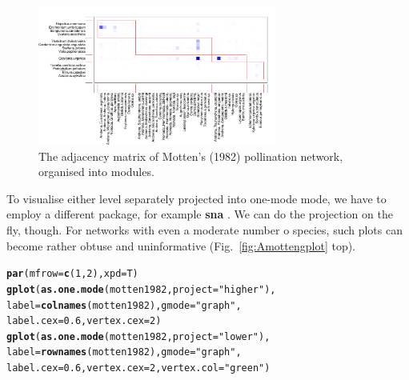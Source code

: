 \documentclass[a4paper, 11pt]{article}\usepackage[]{graphicx}\usepackage[]{color}
\makeatletter
\newcommand{\hlnum}[1]{\textcolor[rgb]{0.686,0.059,0.569}{#1}}%
\newcommand{\hlstr}[1]{\textcolor[rgb]{0.192,0.494,0.8}{#1}}%
\newcommand{\hlstd}[1]{\textcolor[rgb]{0.345,0.345,0.345}{#1}}%
\newcommand{\hlkwc}[1]{\textcolor[rgb]{0.333,0.667,0.333}{#1}}%
\newcommand{\hlkwd}[1]{\textcolor[rgb]{0.737,0.353,0.396}{\textbf{#1}}}%
\newenvironment{kframe}{%
 \def\at@end@of@kframe{}%
 \ifinner\ifhmode%
  \def\at@end@of@kframe{\end{minipage}}%
  \begin{minipage}{\columnwidth}%
 \fi\fi%
 \def\FrameCommand##1{\hskip\@totalleftmargin \hskip-\fboxsep
 \colorbox{shadecolor}{##1}\hskip-\fboxsep
     \hskip-\linewidth \hskip-\@totalleftmargin \hskip\columnwidth}%
 \MakeFramed {\advance\hsize-\width
   \@totalleftmargin\z@ \linewidth\hsize
   \@setminipage}}%
 {\par\unskip\endMakeFramed%
 \at@end@of@kframe}
\newenvironment{knitrout}{}{} %
\newcommand{\package}[1]{\textbf{#1}}
\makeatother
\begin{document}
\begin{figure}%
\centering
	\includegraphics[width=0.7\textwidth]{figures/motten1982_moduleplot}
	\caption{The adjacency matrix of Motten's (1982) pollination network, organised into modules.}
	\label{fig:Amoduleplot}
\end{figure}
%
To visualise either level separately projected into one-mode mode, we have to employ a different package, for example \package{sna} \citep{Butts2013}. We can do the projection on the fly, though. For networks with even a moderate number o species, such plots can become rather obtuse and uninformative (Fig.~\ref{fig:Amottengplot} top).
\begin{knitrout}
\color{fgcolor}\begin{kframe}
\begin{alltt}
\hlkwd{par}\hlstd{(}\hlkwc{mfrow}\hlstd{=}\hlkwd{c}\hlstd{(}\hlnum{1}\hlstd{,}\hlnum{2}\hlstd{),} \hlkwc{xpd}\hlstd{=T)}
\hlkwd{gplot}\hlstd{(}\hlkwd{as.one.mode}\hlstd{(motten1982,} \hlkwc{project}\hlstd{=}\hlstr{"higher"}\hlstd{),}
 \hlkwc{label}\hlstd{=}\hlkwd{colnames}\hlstd{(motten1982),} \hlkwc{gmode}\hlstd{=}\hlstr{"graph"}\hlstd{,}
\hlkwc{label.cex}\hlstd{=}\hlnum{0.6}\hlstd{,} \hlkwc{vertex.cex}\hlstd{=}\hlnum{2}\hlstd{)}
\hlkwd{gplot}\hlstd{(}\hlkwd{as.one.mode}\hlstd{(motten1982,} \hlkwc{project}\hlstd{=}\hlstr{"lower"}\hlstd{),}
        \hlkwc{label}\hlstd{=}\hlkwd{rownames}\hlstd{(motten1982),} \hlkwc{gmode}\hlstd{=}\hlstr{"graph"}\hlstd{,}
        \hlkwc{label.cex}\hlstd{=}\hlnum{0.6}\hlstd{,} \hlkwc{vertex.cex}\hlstd{=}\hlnum{2}\hlstd{,} \hlkwc{vertex.col}\hlstd{=}\hlstr{"green"}\hlstd{)}
\end{alltt}
\end{kframe}
\end{knitrout}
\end{document}
